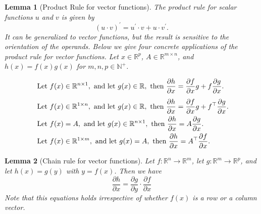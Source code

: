 \documentclass{article}
\newtheorem{lemma}{Lemma}
\newcommand{\Derivative}[2]{\ensuremath{\frac{\partial #1}{\partial #2}}}
\newcommand{\Reals}{\mathbb{R}}
\begin{document}
\begin{lemma}[Product Rule for vector functions] \label{lemma:product-rule}
The product rule for scalar functions $u$ and $v$ is given by
\[
(u \cdot v)^{\prime} = u^{\prime} \cdot v + u \cdot v^{\prime}.
\]
It can be generalized to vector functions, but the result is sensitive to the orientation of the operands. Below we give four concrete applications of the product rule for vector functions.
Let $x \in \Reals^{p}$, $A \in \Reals^{m \times n}$, and $h(x) = f(x) g(x)$ for $m, n, p \in \mathbb{N}^{+}$.
\begin{table}[h]
\begin{alignat}{2}
&
\text{ Let } f(x) \in \Reals^{n \times 1},
\text{ and let } g(x) \in \Reals, 
\text{ then }
\Derivative{h}{x} = \Derivative{f}{x} g + f \Derivative{g}{x}.
\label{eq:product-rule1}
\\ \addlinespace[1ex]
&
\text{ Let } f(x) \in \Reals^{1 \times n},
\text{ and let } g(x) \in \Reals,
\text{ then }
\Derivative{h}{x} = \Derivative{f}{x} g + f^\top \Derivative{g}{x}.
\label{eq:product-rule2}
\\
&
\text{ Let } f(x) = A,
\text{ and let } g(x) \in \Reals^{n \times 1},
\text{ then }
\Derivative{h}{x} = A \Derivative{g}{x}.
\label{eq:product-rule3}
\\
&
\text{ Let } f(x) \in \Reals^{1 \times m},
\text{ and let } g(x) = A,
\text{ then }
\Derivative{h}{x} = A^\top \Derivative{f}{x}.
\label{eq:product-rule4}
\end{alignat}
\label{table:product-rule}
\end{table}
\end{lemma}

\begin{lemma}[Chain rule for vector functions] \label{lemma:chain-rule}
    Let $f: \Reals^n \rightarrow \Reals^m$, let 
    $g: \Reals^m \rightarrow \Reals^p$,
    and let $h(x) = g(y)$ with $y = f(x)$. Then we have
    \begin{equation} \label{eq:chain-rule}
       \frac{\partial h}{\partial x} = 
       \frac{\partial g}{\partial y} \cdot
       \frac{\partial f}{\partial x}
    \end{equation}
    Note that this equations holds irrespective of whether $f(x)$ is a row or a column vector.
\end{lemma}
\vspace{0.3cm}
\end{document}
